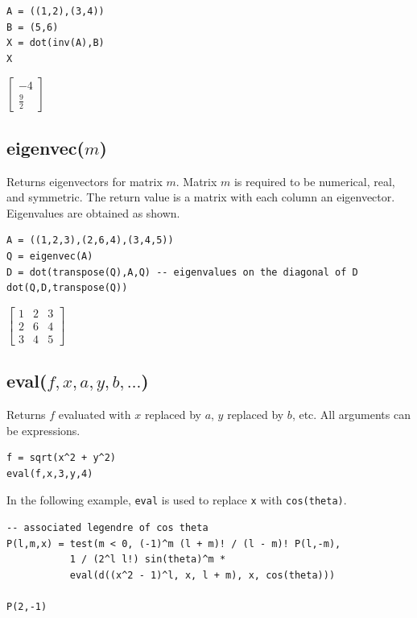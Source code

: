 \documentclass[12pt]{article}
\begin{document}
{\color{blue}
\begin{verbatim}
A = ((1,2),(3,4))
B = (5,6)
X = dot(inv(A),B)
X
\end{verbatim}
}

\noindent
$\displaystyle
\begin{bmatrix}
-4
\\[1ex]
\tfrac{9}{2}
\end{bmatrix}
$

\subsection*{eigenvec($m$)}

Returns eigenvectors for matrix $m$.
Matrix $m$ is required to be numerical, real, and symmetric.
The return value is a matrix with each column an eigenvector.
Eigenvalues are obtained as shown.

{\color{blue}
\begin{verbatim}
A = ((1,2,3),(2,6,4),(3,4,5))
Q = eigenvec(A)
D = dot(transpose(Q),A,Q) -- eigenvalues on the diagonal of D
dot(Q,D,transpose(Q))
\end{verbatim}
}

\noindent
$\displaystyle
\begin{bmatrix}
1 & 2 & 3
\\[1ex]
2 & 6 & 4
\\[1ex]
3 & 4 & 5
\end{bmatrix}
$

\subsection*{eval($f,x,a,y,b,\ldots$)}

Returns $f$ evaluated with $x$ replaced by $a$, $y$ replaced by $b$, etc.
All arguments can be expressions.

{\color{blue}
\begin{verbatim}
f = sqrt(x^2 + y^2)
eval(f,x,3,y,4)
\end{verbatim}
}


\bigskip
\noindent
In the following example, \verb$eval$ is used to replace
\verb$x$ with \verb$cos(theta)$.

{\color{blue}
\begin{verbatim}
-- associated legendre of cos theta
P(l,m,x) = test(m < 0, (-1)^m (l + m)! / (l - m)! P(l,-m),
           1 / (2^l l!) sin(theta)^m *
           eval(d((x^2 - 1)^l, x, l + m), x, cos(theta)))

P(2,-1)
\end{verbatim}
}
\end{document}
